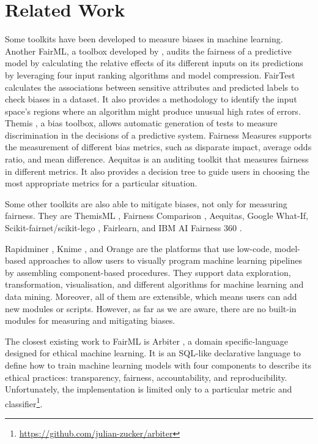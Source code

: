 \documentclass[sigconf,review]{acmart}
\begin{document}
	\section{Related Work}
	\label{sec:related_work}
	
	Some toolkits have been developed to measure biases in machine learning. 
	Another FairML, a toolbox developed by \cite{adebayo2016fairml}, audits the fairness of a predictive model by calculating the relative effects of its different inputs on its predictions by leveraging four input ranking algorithms and model compression. 
	FairTest \cite{tramer2017fairtest} calculates the associations between sensitive attributes and predicted labels to check biases in a dataset. It also provides a methodology to identify the input space's regions where an algorithm might produce unusual high rates of errors.
	Themis \cite{galhotra2017themis}, a bias toolbox, allows automatic generation of tests to measure discrimination in the decisions of a predictive system.
	Fairness Measures \cite{zehlike2017fairness} supports the measurement of different bias metrics, such as disparate impact, average odds ratio, and mean difference. 
	Aequitas \cite{saleiro2019aequitas} is an auditing toolkit that measures fairness in different metrics. It also provides a decision tree to guide users in choosing the most appropriate metrics for a particular situation. 
	
	Some other toolkits are also able to mitigate biases, not only for measuring fairness. They are ThemisML \cite{bantilan2018themis}, Fairness Comparison \cite{friedler2019fairness}, Aequitas\cite{saleiro2019aequitas}, Google What-If\cite{googlewhatif2020}, Scikit-fairnet/scikit-lego \cite{scikitfairness2022,scikitlego2022}, Fairlearn\cite{bird2020fairlearn}, and IBM AI Fairness 360 \cite{bellamy2018ai}.
	
	Rapidminer \cite{hofmann2016rapidminer}, Knime \cite{berthold2008knime}, and Orange \cite{demsar2013orange} are the platforms that use low-code, model-based approaches to allow users to visually program machine learning pipelines by assembling component-based procedures. They support data exploration, transformation, visualisation, and different algorithms for machine learning and data mining. Moreover, all of them are extensible, which means users can add new modules or scripts. However, as far as we are aware, there are no built-in modules for measuring and mitigating biases. 
	
	The closest existing work to FairML is Arbiter \cite{zucker2020arbiter}, a domain specific-language designed for ethical machine learning. It is an SQL-like declarative language to define how to train machine learning models with four components to describe its ethical practices: transparency, fairness, accountability, and reproducibility. Unfortunately, the implementation is limited only to a particular metric and classifier\footnote{\url{https://github.com/julian-zucker/arbiter}}.
	
\end{document}
